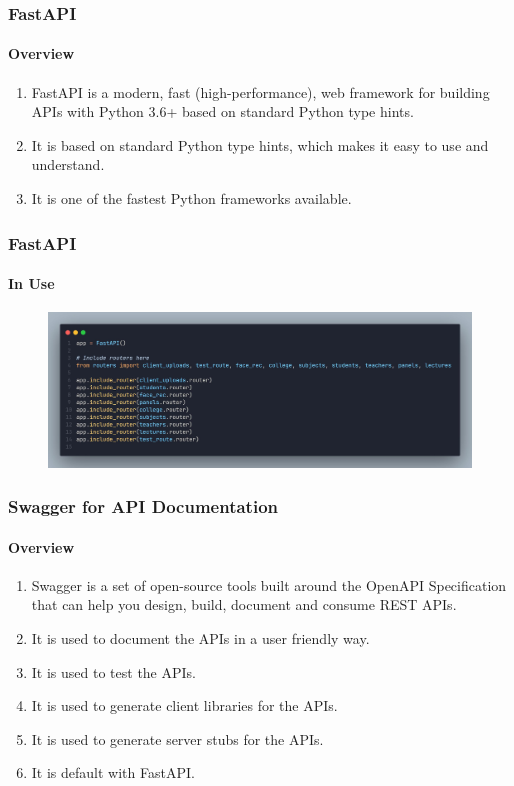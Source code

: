 \documentclass[aspectratio=169]{beamer}
\begin{document}
\begin{frame}
	\centering
	\frametitle{FastAPI}
	\framesubtitle{Overview}
	\begin{minipage}{0.95\textwidth}
		\begin{enumerate}
			\item FastAPI is a modern, fast (high-performance), web framework for building APIs with Python 3.6+ based on standard Python type hints.
			\item It is based on standard Python type hints, which makes it easy to use and understand.
			\item It is one of the fastest Python frameworks available.
		\end{enumerate}
	\end{minipage}
\end{frame}

\begin{frame}
	\centering
	\frametitle{FastAPI}
	\framesubtitle{In Use}
	\begin{figure}[H]
		\centering
		\includegraphics[width=.95\textwidth]{fastapi.jpg}
	\end{figure}
\end{frame}

\begin{frame}
	\centering
	\frametitle{Swagger for API Documentation}
	\framesubtitle{Overview}
	\begin{minipage}{0.95\textwidth}
		\begin{enumerate}
			\item Swagger is a set of open-source tools built around the OpenAPI Specification that can help you design, build, document and consume REST APIs.
			\item It is used to document the APIs in a user friendly way.
			\item It is used to test the APIs.
			\item It is used to generate client libraries for the APIs.
			\item It is used to generate server stubs for the APIs.
			\item It is default with FastAPI.
		\end{enumerate}
	\end{minipage}
\end{frame}
\end{document}
